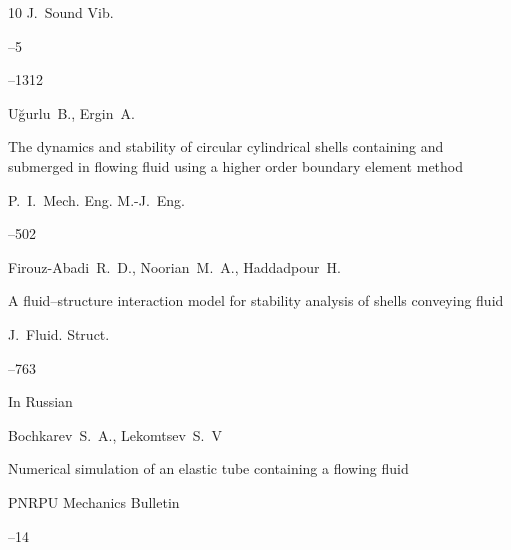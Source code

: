 \begin{thebibliography}{10}
\jour J.~Sound Vib.



--5

--1312








\by U\u{g}urlu~B., Ergin~A.

\paper The dynamics and stability of circular cylindrical shells containing and submerged in flowing fluid using a higher order boundary element method

\jour P.~I.~Mech. Eng. M.-J.~Eng.




--502






\by Firouz-Abadi~R.~D., Noorian~M.~A., Haddadpour~H.

\paper A fluid–structure interaction model for stability analysis of shells conveying fluid

\jour J.~Fluid. Struct.




--763






\lang In Russian

\by Bochkarev~S.~A., Lekomtsev~S.~V

\paper Numerical simulation of an elastic tube containing a flowing fluid

\jour PNRPU Mechanics Bulletin



--14




\end{thebibliography}
